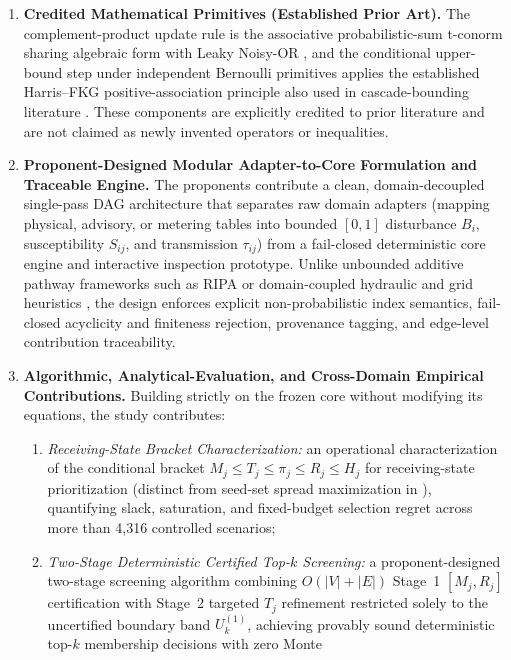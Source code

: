 \begin{enumerate}[label=\arabic*.,leftmargin=*]
\item \textbf{Credited Mathematical Primitives (Established Prior Art).}
The complement-product update rule is the associative probabilistic-sum
t-conorm \citep{klement2004} sharing algebraic form with Leaky Noisy-OR
\citep{fallet2012}, and the conditional upper-bound step under independent
Bernoulli primitives applies the established Harris--FKG positive-association
principle also used in cascade-bounding literature \citep{abbe2017,abbe2020}.
These components are explicitly credited to prior literature and are not
claimed as newly invented operators or inequalities.
\item \textbf{Proponent-Designed Modular Adapter-to-Core Formulation and
Traceable Engine.} The proponents contribute a clean, domain-decoupled
single-pass DAG architecture that separates raw domain adapters (mapping
physical, advisory, or metering tables into bounded $[0,1]$ disturbance
$B_i$, susceptibility $S_{ij}$, and transmission $\tau_{ij}$) from a
fail-closed deterministic core engine and interactive inspection prototype.
Unlike unbounded additive pathway frameworks such as RIPA \citep{faraji2026}
or domain-coupled hydraulic and grid heuristics \citep{dastgir2023,zhang2025},
the design enforces explicit non-probabilistic index semantics, fail-closed
acyclicity and finiteness rejection, provenance tagging, and edge-level
contribution traceability.
\item \textbf{Algorithmic, Analytical-Evaluation, and Cross-Domain Empirical
Contributions.} Building strictly on the frozen core without modifying its
equations, the study contributes:
\begin{enumerate}[label=(\alph*),leftmargin=*]
\item \emph{Receiving-State Bracket Characterization:} an operational
characterization of the conditional bracket
$M_j \le T_j \le \pi_j \le R_j \le H_j$ for receiving-state prioritization
(distinct from seed-set spread maximization in
\citealp{kempe2003,chen2010mia,abbe2020}), quantifying slack, saturation, and
fixed-budget selection regret across more than 4,316 controlled scenarios;
\item \emph{Two-Stage Deterministic Certified Top-$k$ Screening:} a
proponent-designed two-stage screening algorithm combining $O(|V|+|E|)$
Stage~1 $[M_j, R_j]$ certification with Stage~2 targeted $T_j$ refinement
restricted solely to the uncertified boundary band $U_k^{(1)}$, achieving
provably sound deterministic top-$k$ membership decisions with zero Monte

\end{enumerate}
\end{enumerate}
